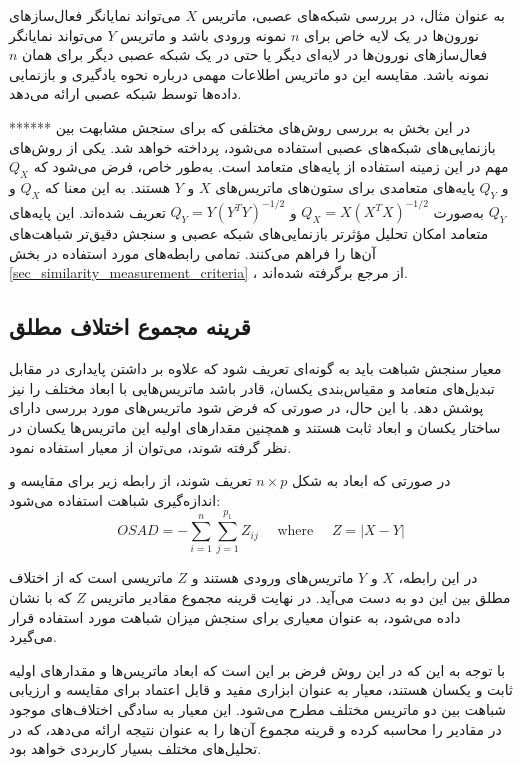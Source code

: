  به عنوان مثال، در بررسی شبکه‌های عصبی، ماتریس \( X \) می‌تواند نمایانگر فعال‌سازهای%
 نورون‌ها در یک لایه خاص برای \( n \) نمونه ورودی باشد و ماتریس \( Y \) می‌تواند نمایانگر فعال‌سازهای نورون‌ها در لایه‌ای دیگر یا حتی در یک شبکه عصبی دیگر برای همان \( n \) نمونه باشد. مقایسه این دو ماتریس اطلاعات مهمی درباره نحوه یادگیری و بازنمایی داده‌ها توسط شبکه عصبی ارائه می‌دهد.
 
 
******
 در این بخش به بررسی روش‌های مختلفی که برای سنجش مشابهت بین بازنمایی‌های شبکه‌های عصبی استفاده می‌شود، پرداخته خواهد شد. یکی از روش‌های مهم در این زمینه استفاده از پایه‌های متعامد است. به‌طور خاص، فرض می‌شود که \( Q_X \) و \( Q_Y \) پایه‌های متعامدی برای ستون‌های ماتریس‌های \( X \) و \( Y \) هستند. به این معنا که \( Q_X \) و \( Q_Y \) به‌صورت \( Q_X = X(X^T X)^{-1/2} \) و \( Q_Y = Y(Y^T Y)^{-1/2} \) تعریف شده‌اند. این پایه‌های متعامد امکان تحلیل مؤثرتر بازنمایی‌های شبکه عصبی و سنجش دقیق‌تر شباهت‌های آن‌ها را فراهم می‌کنند.
 تمامی رابطه‌های مورد استفاده در بخش
 \ref{sec_similarity_measurement_criteria}%
 ، از مرجع 
 \cite{kornblith2019similarity} 
 برگرفته شده‌اند.
 
 
 
 
 \subsection{
 	قرینه مجموع اختلاف مطلق%
 }
 معیار سنجش شباهت باید به گونه‌ای تعریف شود که علاوه بر داشتن پایداری در مقابل تبدیل‌های متعامد و مقیاس‌بندی یکسان، قادر باشد ماتریس‌هایی با ابعاد مختلف را نیز پوشش دهد. با این حال، در صورتی که فرض شود ماتریس‌های مورد بررسی دارای ساختار یکسان و ابعاد ثابت هستند و همچنین مقدار‌های اولیه این ماتریس‌ها یکسان در نظر گرفته شوند، می‌توان از معیار
 استفاده نمود.
 
 در صورتی که ابعاد به شکل \( n \times p \) تعریف شوند، از رابطه زیر برای مقایسه و اندازه‌گیری شباهت استفاده می‌شود:
 \begin{equation}
 	OSAD = -\sum_{i=1}^n \sum_{j=1}^{p_1} Z_{ij}
 	\quad \text { where } \quad
 	Z = |X-Y|
 \end{equation}
 
 در این رابطه، \( X \) و \( Y \) ماتریس‌های ورودی هستند و \( Z \) ماتریسی است که از اختلاف مطلق بین این دو به دست می‌آید. در نهایت قرینه مجموع مقادیر ماتریس \( Z \) که با
 نشان داده می‌شود، به عنوان معیاری برای سنجش میزان شباهت مورد استفاده قرار می‌گیرد.
 
 با توجه به این که در این روش فرض بر این است که ابعاد ماتریس‌ها و مقدار‌های اولیه ثابت و یکسان هستند، معیار
 به عنوان ابزاری مفید و قابل اعتماد برای مقایسه و ارزیابی شباهت بین دو ماتریس مختلف مطرح می‌شود. این معیار به سادگی اختلاف‌های موجود در مقادیر را محاسبه کرده و قرینه مجموع آن‌ها را به عنوان نتیجه ارائه می‌دهد، که در تحلیل‌های مختلف بسیار کاربردی خواهد بود.
 
